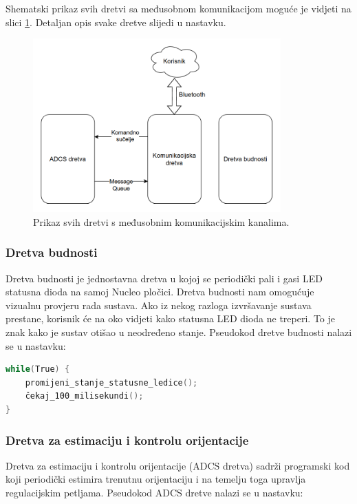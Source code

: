 \documentclass[times, utf8, diplomski, numeric]{templates/template}
\begin{document}
{{{            Shematski prikaz svih dretvi sa međusobnom komunikacijom moguće je vidjeti na slici \ref{fig:dijagram_dretvi}. Detaljan opis svake dretve slijedi u nastavku.

            \begin{figure}[htb]
            \centering
            \includegraphics[width=0.85\textwidth]{other/dijagram_dretvi.png}
            \caption{Prikaz svih dretvi s međusobnim komunikacijskim kanalima.}
            \label{fig:dijagram_dretvi}
            \end{figure}

            \subsubsection{Dretva budnosti}{
                Dretva budnosti je jednostavna dretva u kojoj se periodički pali i gasi LED statusna dioda na samoj Nucleo pločici. Dretva budnosti nam omogućuje vizualnu provjeru rada sustava. Ako iz nekog razloga izvršavanje sustava prestane, korisnik će na oko vidjeti kako statusna LED dioda ne treperi. To je znak kako je sustav otišao u neodređeno stanje. Pseudokod dretve budnosti nalazi se u nastavku:

                \begin{lstlisting}[language=C]
while(True) {
    promijeni_stanje_statusne_ledice();
    čekaj_100_milisekundi();
}               \end{lstlisting}
            }
    
            \subsubsection{Dretva za estimaciju i kontrolu orijentacije}{
                Dretva za estimaciju i kontrolu orijentacije (ADCS dretva) sadrži programski kod koji periodički estimira trenutnu orijentaciju i na temelju toga upravlja regulacijskim petljama. Pseudokod ADCS dretve nalazi se u nastavku:
        
}}}}
\end{document}
